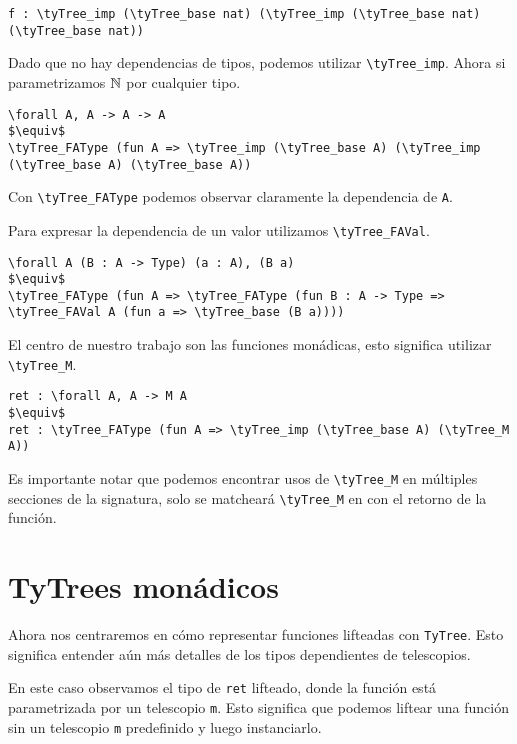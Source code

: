 \begin{lstlisting}
f : \tyTree_imp (\tyTree_base nat) (\tyTree_imp (\tyTree_base nat) (\tyTree_base nat))
\end{lstlisting}

Dado que no hay dependencias de tipos, podemos utilizar \lstinline{\tyTree_imp}. Ahora si parametrizamos
$\mathbb{N}$ por cualquier tipo.

\begin{lstlisting}
\forall A, A -> A -> A
$\equiv$
\tyTree_FAType (fun A => \tyTree_imp (\tyTree_base A) (\tyTree_imp (\tyTree_base A) (\tyTree_base A))
\end{lstlisting}

Con \lstinline{\tyTree_FAType} podemos observar claramente la dependencia de \lstinline{A}.

Para expresar la dependencia de un valor utilizamos \lstinline{\tyTree_FAVal}.

\begin{lstlisting}
\forall A (B : A -> Type) (a : A), (B a)
$\equiv$
\tyTree_FAType (fun A => \tyTree_FAType (fun B : A -> Type => \tyTree_FAVal A (fun a => \tyTree_base (B a))))
\end{lstlisting}

El centro de nuestro trabajo son las funciones monádicas, esto significa utilizar \lstinline{\tyTree_M}.

\begin{lstlisting}
ret : \forall A, A -> M A
$\equiv$
ret : \tyTree_FAType (fun A => \tyTree_imp (\tyTree_base A) (\tyTree_M A))
\end{lstlisting}

Es importante notar que podemos encontrar usos de \lstinline{\tyTree_M} en múltiples secciones de la signatura, solo se matcheará \lstinline{\tyTree_M} en \lift con el retorno de la función. 
\fi


\section{TyTrees monádicos}

Ahora nos centraremos en cómo representar funciones lifteadas con \lstinline{TyTree}.
Esto significa entender aún más detalles de los tipos dependientes de telescopios.

En este caso observamos el tipo de \lstinline{ret} lifteado, donde la función está parametrizada por un telescopio \lstinline{m}.
Esto significa que podemos liftear una función sin un telescopio \lstinline{m} predefinido y luego instanciarlo.

